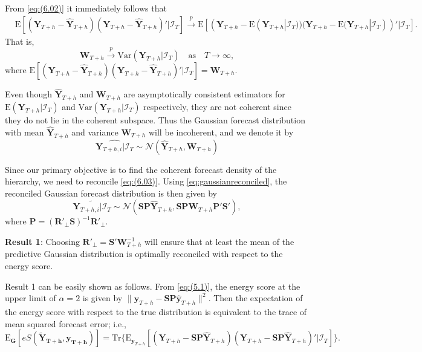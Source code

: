 \documentclass[a4paper, 11pt]{article}
\def\E{\text{E}}
\theoremstyle{theo}
\theoremstyle{definition}
\begin{document}
From \eqref{eq:(6.02)} it immediately follows that
\begin{align*}
&\E[(\bm{Y}_{T+h} - \hat{\bm{Y}}_{T+h})(\bm{Y}_{T+h} - \hat{\bm{Y}}_{T+h})'|\bm{\mathcal{I}}_T] \overset{p}{\to} \E[(\bm{Y}_{T+h} - \E(\bm{Y}_{T+h}|\bm{\mathcal{I}}_T))(\bm{Y}_{T+h} - \E(\bm{Y}_{T+h}|\bm{\mathcal{I}}_T))'|\bm{\mathcal{I}}_T].
\end{align*}
That is,
\begin{equation}
\bm{W}_{T+h} \overset{p}{\to} \text{Var}(\bm{Y}_{T+h}|\bm{\mathcal{I}}_T) \quad \text{as} \quad T \to \infty,
\end{equation}
where $\E[(\bm{Y}_{T+h} - \hat{\bm{Y}}_{T+h})(\bm{Y}_{T+h} - \hat{\bm{Y}}_{T+h})'|\bm{\mathcal{I}}_T] = \bm{W}_{T+h}$.

Even though $\hat{\bm{Y}}_{T+h}$ and $\bm{W}_{T+h}$ are asymptotically consistent estimators for $\E(\bm{Y}_{T+h}|\bm{\mathcal{I}}_T)$ and $\text{Var}(\bm{Y}_{T+h}|\bm{\mathcal{I}}_T)$ respectively, they are not coherent since they do not lie in the coherent subspace. Thus the Gaussian forecast distribution with mean $\hat{\bm{Y}}_{T+h}$ and variance $\bm{W}_{T+h}$ will be incoherent, and we denote it by
\begin{equation}\label{eq:(6.03)}
\widehat{\bm{Y}_{T+h,i}|\bm{\mathcal{I}}_T} \sim \mathcal{N}(\hat{\bm{Y}}_{T+h}, \bm{W}_{T+h})
\end{equation}

Since our primary objective is to find the coherent forecast density of the hierarchy, we need to reconcile \eqref{eq:(6.03)}. Using \eqref{eq:gaussianreconciled}, the reconciled Gaussian forecast distribution is then given by
\begin{equation}\label{eq:(6.04)}
\widetilde{\bm{Y}_{T+h,i}|\bm{\mathcal{I}}_T} \sim \mathcal{N}(\bm{SP}\hat{\bm{Y}}_{T+h}, \bm{SP}\bm{W}_{T+h}\bm{P}'\bm{S}'),
\end{equation}
where $\bm{P} = (\bm{R}'_\bot \bm{S})^{-1}\bm{R}'_\bot$.

\textbf{Result 1}: Choosing $\bm{R}'_\bot = \bm{S}'\bm{W}_{T+h}^{-1}$ will ensure that at least the mean of the predictive Gaussian distribution is optimally reconciled with respect to the energy score.

Result 1 can be easily shown as follows. From \eqref{eq:(5.1)}, the energy score at the upper limit of $\alpha=2$ is given by $\|\bm{y}_{T+h}-\bm{SP}\hat{\bm{y}}_{T+h}\|^2$. Then the expectation of the energy score with respect to the true distribution is equivalent to the trace of mean squared forecast error; i.e.,
$$
\E_{\bm{G}}[eS(\bm{\tilde{Y}_{T+h},y_{T+h}})]= \text{Tr}\{\E_{\bm{y}_{T+h}}[(\bm{Y}_{T+h}-\bm{SP}\hat{\bm{Y}}_{T+h})(\bm{Y}_{T+h}-\bm{SP}\hat{\bm{Y}}_{T+h})'|\mathcal{I}_{T}]\}.
$$
\end{document}
